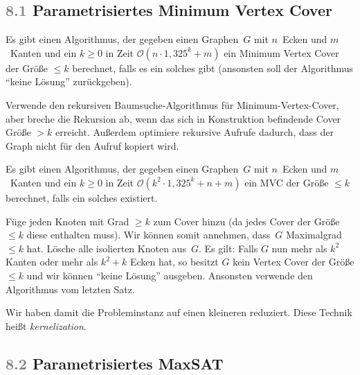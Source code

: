 \documentclass{cheat-sheet}
\renewcommand{\O}{\mathcal{O}} %
\newcommand{\Problem}[1]{\textcolor{ProblemColor}{\textbf{#1}}}
\newcommand{\scriptSection}[1]{\textcolor{gray}{#1}\enspace}
\begin{document}
\subsection{\scriptSection{8.1} Parametrisiertes \Problem{Minimum Vertex Cover}}

\begin{satz}
  Es gibt einen Algorithmus, der gegeben einen Graphen~$G$ mit $n$~Ecken und $m$~Kanten und ein $k \geq 0$ in Zeit $\O(n \cdot 1,325^{k} + m)$ ein Minimum Vertex Cover der Größe $\leq k$ berechnet, falls es ein solches gibt (ansonsten soll der Algorithmus "`keine Lösung"' zurückgeben).
\end{satz}

\begin{idee}
  Verwende den rekursiven Baumsuche-Algorithmus für Minimum-Vertex-Cover, aber breche die Rekursion ab, wenn das sich in Konstruktion befindende Cover Größe $> k$ erreicht.
  Außerdem optimiere rekursive Aufrufe dadurch, dass der Graph nicht für den Aufruf kopiert wird.
\end{idee}

\begin{satz}
  Es gibt einen Algorithmus, der gegeben einen Graphen~$G$ mit $n$~Ecken und $m$~Kanten und ein $k \geq 0$ in Zeit $\O(k^2 \cdot 1,325^{k} + n + m)$ ein MVC der Größe $\leq k$ berechnet, falls ein solches existiert.
\end{satz}

\begin{idee}
  Füge jeden Knoten mit Grad $\geq k$ zum Cover hinzu (da jedes Cover der Größe $\leq k$ diese enthalten muss).
  Wir können somit annehmen, dass~$G$ Maximalgrad $\leq k$ hat.
  Lösche alle isolierten Knoten aus~$G$.
  Es gilt: Falls $G$ nun mehr als $k^2$ Kanten oder mehr als $k^2 + k$ Ecken hat, so besitzt $G$ kein Vertex Cover der Größe $\leq k$ und wir können "`keine Lösung"' ausgeben.
  Ansonsten verwende den Algorithmus vom letzten Satz.
\end{idee}

\begin{bem}
  Wir haben damit die Probleminstanz auf einen kleineren  reduziert.
  Diese Technik heißt \textit{kernelization}.
\end{bem}

\subsection{\scriptSection{8.2} Parametrisiertes \Problem{MaxSAT}}
\end{document}
